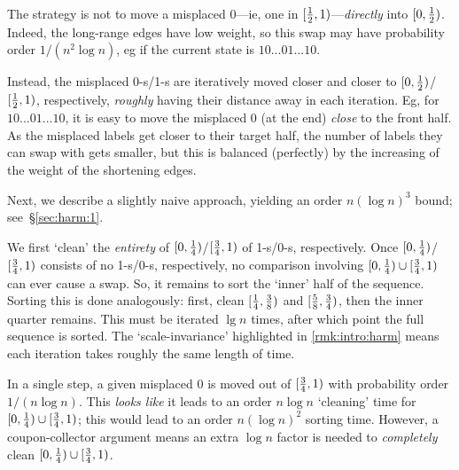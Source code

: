 \documentclass{article}
\begin{document}
\begin{Proof}
\qedtriangle
The strategy is not to move a misplaced 0---ie, one in $[\tfrac12, 1)$---\emph{directly} into $[0, \tfrac12)$.
Indeed, the long-range edges have low weight, so this swap may have probability order $1/(n^2 \log n)$, eg if the current state is $10...01...10$.

Instead, the misplaced 0-s/1-s are iteratively moved closer and closer to $[0, \tfrac12)$/$[\tfrac12, 1)$, respectively, \emph{roughly} having their distance away in each iteration.
Eg, for $10...01...10$, it is easy to move the misplaced 0 (at the end) \emph{close} to the front half.
As the misplaced labels get closer to their target half, the number of labels they can swap with gets smaller, but this is balanced (perfectly) by the increasing of the weight of the shortening edges.
\end{Proof}

Next, we describe a slightly naive approach, yielding an order $n (\log n)^3$ bound;
see~\S\ref{sec:harm:1}.

\begin{Proof}
\qedtriangle
We first `clean' the \emph{entirety} of $[0, \tfrac14)$/$[\tfrac34, 1)$ of 1-s/0-s, respectively.
Once $[0, \tfrac14)$/$[\tfrac34, 1)$ consists of no 1-s/0-s, respectively, no comparison involving $[0, \tfrac14) \cup [\tfrac34, 1)$ can ever cause a swap.
So, it remains to sort the `inner' half of the sequence.
%
Sorting this is done analogously:
	first, clean $[\tfrac14, \tfrac38)$ and $[\tfrac58, \tfrac34)$,
	then the inner quarter remains.
This must be iterated $\lg n$ times, after which point the full sequence is sorted.
The `scale-invariance' highlighted in \cref{rmk:intro:harm} means each iteration takes roughly the same length of time.

In a single step, a given misplaced 0 is moved out of $[\tfrac34, 1)$ with probability order $1/(n \log n)$.
This \emph{looks like} it leads to an order $n \log n$ `cleaning' time for $[0, \tfrac14) \cup [\tfrac34, 1)$; this would lead to an order $n (\log n)^2$ sorting time.
However, a coupon-collector argument means an extra $\log n$ factor is needed to \emph{completely} clean $[0, \tfrac14) \cup [\tfrac34, 1)$.
\end{Proof}
\end{document}
